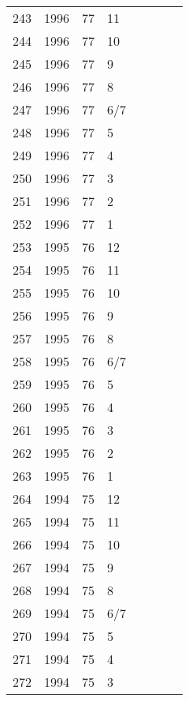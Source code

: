 \begin{longtable}{ |l|l|l|l|l|l|l|l| }
243 & 1996 & 77 &    11 &         &  &  & \\
244 & 1996 & 77 &    10 &         &  &  & \\
245 & 1996 & 77 &     9 &         &  &  & \\
246 & 1996 & 77 &     8 &         &  &  & \\
247 & 1996 & 77 &   6/7 &         &  &  & \\
248 & 1996 & 77 &     5 &         &  &  & \\
249 & 1996 & 77 &     4 &         &  &  & \\
250 & 1996 & 77 &     3 &         &  &  & \\
251 & 1996 & 77 &     2 &         &  &  & \\
252 & 1996 & 77 &     1 &         &  &  & \\
253 & 1995 & 76 &    12 &         &  &  & \\
254 & 1995 & 76 &    11 &         &  &  & \\
255 & 1995 & 76 &    10 &         &  &  & \\
256 & 1995 & 76 &     9 &         &  &  & \\
257 & 1995 & 76 &     8 &         &  &  & \\
258 & 1995 & 76 &   6/7 &         &  &  & \\
259 & 1995 & 76 &     5 &         &  &  & \\
260 & 1995 & 76 &     4 &         &  &  & \\
261 & 1995 & 76 &     3 &         &   &  & \\
262 & 1995 & 76 &     2 &         &  &  & \\
263 & 1995 & 76 &     1 &         &                &  & \\
264 & 1994 & 75 &    12 &         &                &  & \\
265 & 1994 & 75 &    11 &         &                &  & \\
266 & 1994 & 75 &    10 &         &                &  & \\
267 & 1994 & 75 &     9 &         &                &  & \\
268 & 1994 & 75 &     8 &         &                &  & \\
269 & 1994 & 75 &   6/7 &         &                &  & \\
270 & 1994 & 75 &     5 &         &                &   & \\
271 & 1994 & 75 &     4 &         &                &  & \\
272 & 1994 & 75 &     3 &         &                &  & \\

\end{longtable}
